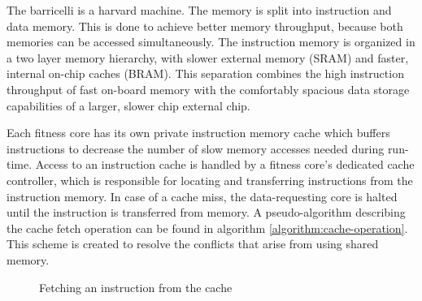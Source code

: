 The \Gls{barricelli} is a \Gls{harvard machine}. \cn
The memory is split into instruction and data memory. 
This is done to achieve better memory throughput, because both memories can be accessed simultaneously.
The instruction memory is organized in a two layer memory hierarchy, with slower external memory (\gls{SRAM}) and faster, internal on-chip caches (\gls{BRAM}).
This separation combines the high instruction throughput of fast on-board memory with the comfortably spacious data storage capabilities of a larger, slower chip external chip.

Each fitness core has its own private instruction memory cache which buffers instructions to decrease the number of slow memory accesses needed during run-time.
Access to an instruction cache is handled by a fitness core's dedicated cache controller, which is responsible for locating and transferring instructions from the instruction memory.
In case of a cache miss, the data-requesting core is halted until the instruction is transferred from memory.
A pseudo-algorithm describing the cache fetch operation can be found in algorithm \vref{algorithm:cache-operation}.
This scheme is created to resolve the conflicts that arise from using shared memory. 

\begin{figure}[H]
\begin{algorithm}[H]
\SetAlgoLined
\DontPrintSemicolon
{}
\Begin{
    \If{$ a = Ca[A \bmod{512}] $}{
        \Return{$ Ci[A \bmod{512}] $}
    }\Else{
        $ Caa \bmod{512}] \longleftarrow a $\;
        $ Ci[a \bmod{512}] \longleftarrow M[a] $\;
        \Return{$ Ci[A \bmod{512}] $}
    }
}
\caption{Fetching an instruction from the cache}
\label{algorithm:cache-operation}
\end{algorithm}
\end{figure}
